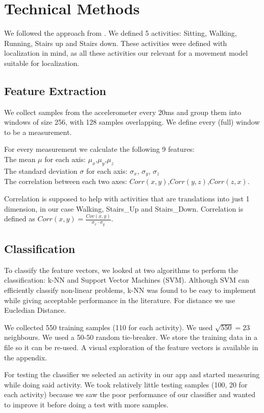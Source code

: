 \section{Technical Methods}
\label{sec:technical-methods}

We followed the approach from \cite{ravi2005activity}. We defined 5 activities: Sitting, Walking, Running, Stairs up and Stairs down. These activities were defined with localization in mind, as all these activities our relevant for a movement model suitable for localization.

\subsection{Feature Extraction}
\label{sec:feature-extraction}
We collect samples from the accelerometer every 20ms and group them into windows of size 256, with 128 samples overlapping. We define every (full) window to be a measurement.

For every measurement we calculate the following 9 features: \\
The mean $\mu$ for each axis: $\mu_x$,$\mu_y$,$\mu_z$ \\
The standard deviation $\sigma$ for each axis: $\sigma_x$, $\sigma_y$, $\sigma_z$ \\
The correlation between each two axes:  $Corr(x,y)$,$Corr(y,z)$,$Corr(z,x)$.


Correlation is supposed to help with activities that are translations into just 1 dimension, in our case Walking, Stairs\_Up and Stairs\_Down.
Correlation is defined as $
	Corr(x,y) = \frac{Cov(x,y)}{\sigma_x \cdot \sigma_y}$.

\subsection{Classification}
\label{sec:classification}
To classify the feature vectors, we looked at two algorithms to perform the classification: k-NN and Support Vector Machines (SVM). Although SVM can efficiently classify non-linear problems, k-NN was found to be easy to implement while giving acceptable performance in the literature. For distance we use Eucledian Distance.

We collected 550 training samples (110 for each activity). We used $\sqrt{550}=23$ neighbours. We used a 50-50 random tie-breaker. We store the training data in a file so it can be re-used. A visual exploration of the feature vectors is available in the appendix.

For testing the classifier we selected an activity in our app and started measuring while doing said activity. We took relatively little testing samples (100, 20 for each activity) because we saw the poor performance of our classifier and wanted to improve it before doing a test with more samples.

